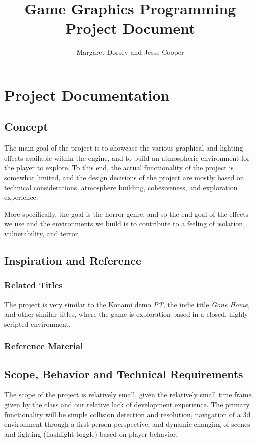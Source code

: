 \documentclass[11pt]{article} %
\title{Game Graphics Programming Project Document}
\author{Margaret Dorsey and Jesse Cooper}
\begin{document}
\maketitle

\section{Project Documentation}

\subsection{Concept}
\par The main goal of the project is to showcase the various graphical and lighting
effects available within the engine, and to build an atmospheric environment for the player to explore. To this end, the actual functionality of the project is somewhat limited, and the design decisions of the project are mostly based on technical considerations, atmosphere building, cohesiveness, and exploration experience.
\par More specifically, the goal is the horror genre, and so the end goal of the effects we use and the environments we build is to contribute to a feeling of isolation, vulnerability, and terror.
\subsection{Inspiration and Reference}
\subsubsection{Related Titles}
The project is very similar to the Konami demo \textit{PT}, the indie title \textit{Gone Home}, and other similar titles, where the game is exploration based in a closed, highly scripted environment.
\subsubsection{Reference Material}

\subsection{Scope, Behavior and Technical Requirements}
The scope of the project is relatively small, given the relatively small time frame given by the class and our relative lack of development experience. The primary functionality will be simple collision detection and resolution, navigation of a 3d environment through a first person perspective, and dynamic changing of scenes and lighting (flashlight toggle) based on player behavior.
\end{document}
